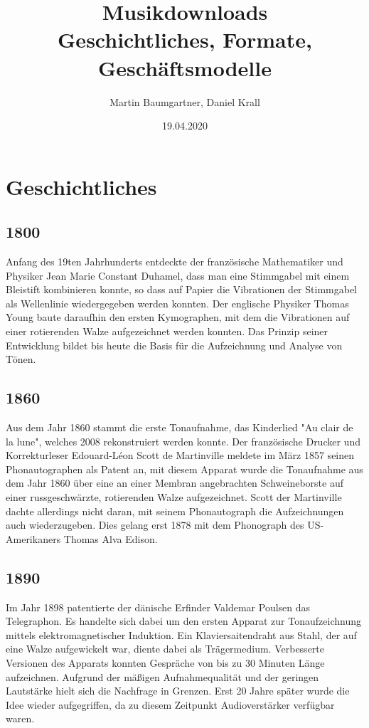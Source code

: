 \documentclass{article}
\begin{document}
	
	\title{\textbf{Musikdownloads} \\ Geschichtliches, Formate, Geschäftsmodelle}
	\author{Martin Baumgartner, Daniel Krall}
	\date{19.04.2020}
	\maketitle
	\newpage
	
	\section*{Geschichtliches}
	\subsection*{1800}
	Anfang des 19ten Jahrhunderts entdeckte der französische Mathematiker und Physiker Jean Marie Constant Duhamel, dass man eine Stimmgabel mit einem Bleistift kombinieren konnte, so dass auf Papier die Vibrationen der Stimmgabel als Wellenlinie wiedergegeben werden konnten. Der englische Physiker Thomas Young baute daraufhin den ersten Kymographen, mit dem die Vibrationen auf einer rotierenden Walze aufgezeichnet werden konnten. Das Prinzip seiner Entwicklung bildet bis heute die Basis für die Aufzeichnung und Analyse von Tönen. \cite{Disc1}
	
	\subsection*{1860}
	Aus dem Jahr 1860 stammt die erste Tonaufnahme, das Kinderlied "Au clair de la lune", welches 2008 rekonstruiert werden konnte. Der französische Drucker und Korrekturleser Edouard-Léon Scott de Martinville meldete im März 1857 seinen Phonautographen als Patent an, mit diesem Apparat wurde die Tonaufnahme aus dem Jahr 1860 über eine an einer Membran angebrachten Schweineborste auf einer russgeschwärzte, rotierenden Walze aufgezeichnet. Scott der Martinville dachte allerdings nicht daran, mit seinem Phonautograph die Aufzeichnungen auch wiederzugeben. Dies gelang erst 1878 mit dem Phonograph des US-Amerikaners Thomas Alva Edison. \cite{Disc2}
	
	\subsection*{1890}
	Im Jahr 1898 patentierte der dänische Erfinder Valdemar Poulsen das Telegraphon. Es handelte sich dabei um den ersten Apparat zur Tonaufzeichnung mittels elektromagnetischer Induktion. Ein Klaviersaitendraht aus Stahl, der auf eine Walze aufgewickelt war, diente dabei als Trägermedium. Verbesserte Versionen des Apparats konnten Gespräche von bis zu 30 Minuten Länge aufzeichnen. Aufgrund der mäßigen Aufnahmequalität  und der geringen Lautstärke hielt sich die Nachfrage in Grenzen. Erst 20 Jahre später wurde die Idee wieder aufgegriffen, da zu diesem Zeitpunkt Audioverstärker verfügbar waren. \cite{Disc3}
	
\end{document}
